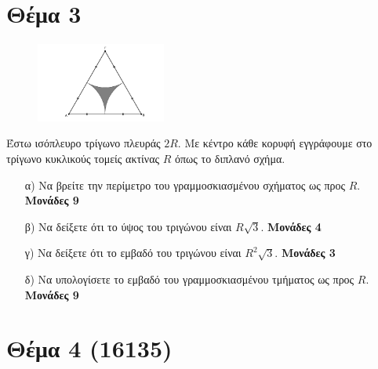 \documentclass[12pt]{extarticle}
\begin{document}
\section*{Θέμα 3}
\noindent

\begin{figure}
    \centering
    \vspace{-20pt}
    \hspace{-80pt}
    \includegraphics[width=0.38\textwidth]{2017BGeo3}
\end{figure}

Έστω ισόπλευρο τρίγωνο πλευράς $2R$. Με κέντρο κάθε κορυφή εγγράφουμε στο τρίγωνο κυκλικούς τομείς ακτίνας $R$ όπως το διπλανό σχήμα.
\begin{enumerate}
    \item[α)] Να βρείτε την περίμετρο του γραμμοσκιασμένου σχήματος ως προς $R$. \hspace*{\fill} \textbf{Μονάδες 9}
    \item[β)] Να δείξετε ότι το ύψος του τριγώνου είναι $R\sqrt{3}$. \hspace*{\fill} \textbf{Μονάδες 4}
    \item[γ)] Να δείξετε ότι το εμβαδό του τριγώνου είναι $R^2\sqrt{3}$. \hspace*{\fill} \textbf{Μονάδες 3}
    \item[δ)] Να υπολογίσετε το εμβαδό του γραμμοσκιασμένου τμήματος ως προς $R$. \hspace*{\fill} \textbf{Μονάδες 9}
\end{enumerate}

\section*{Θέμα 4 (16135)}
\noindent
\end{document}
